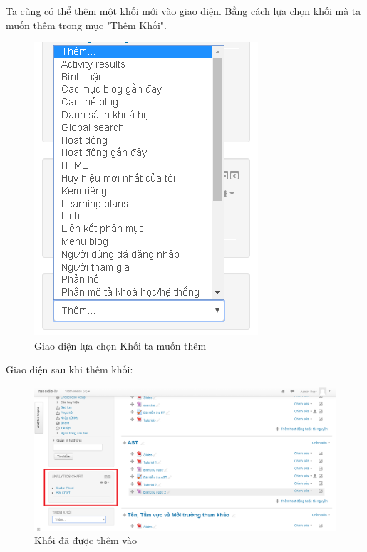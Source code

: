 Ta cũng có thể thêm một khối mới vào giao diện. Bằng cách lựa chọn khối mà ta muốn thêm trong mục "Thêm Khối".
\begin{center}
	\begin{figure}[htp]
		\begin{center}
			\includegraphics[scale=0.8]{img/addblock}
		\end{center}
		\caption{Giao diện lựa chọn Khối ta muốn thêm}
		\label{refhinh3}
	\end{figure}
\end{center}

\vskip 4cm
Giao diện sau khi thêm khối:
\begin{center}
	\begin{figure}[htp]
		\begin{center}
			\includegraphics[scale=0.5]{img/block}
		\end{center}
		\caption{Khối đã được thêm vào}
		\label{refhinh4}
	\end{figure}
\end{center}

